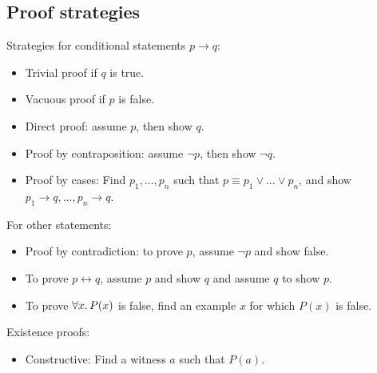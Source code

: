 \subsection{Proof strategies}
Strategies for conditional statements \(p \rightarrow q\):
\begin{itemize}
    \item Trivial proof if \(q\) is true.
    \item Vacuous proof if \(p\) is false.
    \item Direct proof: assume \(p\), then show \(q\).
    \item Proof by contraposition: assume \(\neg p\), then show \(\neg q\).
    \item Proof by cases: Find \(p_1, \dots, p_n\) such that \(p \equiv p_1 \lor \dots \lor p_n\), and show \(p_1 \rightarrow q, \dots, p_n \rightarrow q\).
\end{itemize}
For other statements:
\begin{itemize}
    \item Proof by contradiction: to prove \(p\), assume \(\neg p\) and show false.
    \item To prove \(p \leftrightarrow q\), assume \(p\) and show \(q\) and assume \(q\) to show \(p\).
    \item To prove \(\forall x\ldotp P(x)\) is false, find an example \(x\) for which \(P(x)\) is false.
\end{itemize}
Existence proofs:
\begin{itemize}
    \item Constructive: Find a witness \(a\) such that \(P(a)\).
\end{itemize}
